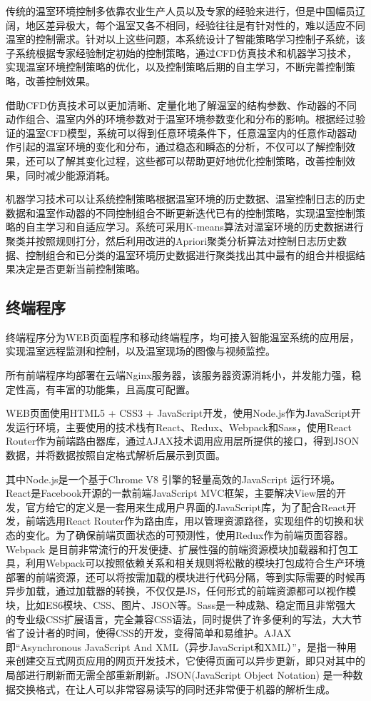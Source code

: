 传统的温室环境控制多依靠农业生产人员以及专家的经验来进行，但是中国幅员辽阔，地区差异极大，每个温室又各不相同，经验往往是有针对性的，难以适应不同温室的控制需求。针对以上这些问题，本系统设计了智能策略学习控制子系统，该子系统根据专家经验制定初始的控制策略，通过CFD仿真技术和机器学习技术，实现温室环境控制策略的优化，以及控制策略后期的自主学习，不断完善控制策略，改善控制效果。

借助CFD仿真技术可以更加清晰、定量化地了解温室的结构参数、作动器的不同动作组合、温室内外的环境参数对于温室环境参数变化和分布的影响。根据经过验证的温室CFD模型，系统可以得到任意环境条件下，任意温室内的任意作动器动作引起的温室环境的变化和分布，通过稳态和瞬态的分析，不仅可以了解控制效果，还可以了解其变化过程，这些都可以帮助更好地优化控制策略，改善控制效果，同时减少能源消耗。

机器学习技术可以让系统控制策略根据温室环境的历史数据、温室控制日志的历史数据和温室作动器的不同控制组合不断更新迭代已有的控制策略，实现温室控制策略的自主学习和自适应学习。系统可采用K-means算法对温室环境的历史数据进行聚类并按照规则打分，然后利用改进的Apriori聚类分析算法对控制日志历史数据、控制组合和已分类的温室环境历史数据进行聚类找出其中最有的组合并根据结果决定是否更新当前控制策略。

	\subsection{终端程序}
终端程序分为WEB页面程序和移动终端程序，均可接入智能温室系统的应用层，实现温室远程监测和控制，以及温室现场的图像与视频监控。

所有前端程序均部署在云端Nginx服务器，该服务器资源消耗小，并发能力强，稳定性高，有丰富的功能集，且高度可配置。

WEB页面使用HTML5 + CSS3 + JavaScript开发，使用Node.js作为JavaScript开发运行环境，主要使用的技术栈有React、Redux、Webpack和Sass，使用React Router作为前端路由器库，通过AJAX技术调用应用层所提供的接口，得到JSON数据，并将数据按照自定格式解析后展示到页面。

其中Node.js是一个基于Chrome V8 引擎的轻量高效的JavaScript 运行环境。React是Facebook开源的一款前端JavaScript MVC框架，主要解决View层的开发，官方给它的定义是一套用来生成用户界面的JavaScript库，为了配合React开发，前端选用React Router作为路由库，用以管理资源路径，实现组件的切换和状态的变化。为了确保前端页面状态的可预测性，使用Redux作为前端页面容器。Webpack 是目前非常流行的开发便捷、扩展性强的前端资源模块加载器和打包工具，利用Webpack可以按照依赖关系和相关规则将松散的模块打包成符合生产环境部署的前端资源，还可以将按需加载的模块进行代码分隔，等到实际需要的时候再异步加载，通过加载器的转换，不仅仅是JS，任何形式的前端资源都可以视作模块，比如ES6模块、CSS、图片、JSON等。Sass是一种成熟、稳定而且非常强大的专业级CSS扩展语言，完全兼容CSS语法，同时提供了许多便利的写法，大大节省了设计者的时间，使得CSS的开发，变得简单和易维护。AJAX即“Asynchronous JavaScript And XML（异步JavaScript和XML）”，是指一种用来创建交互式网页应用的网页开发技术，它使得页面可以异步更新，即只对其中的局部进行刷新而无需全部重新刷新。JSON(JavaScript Object Notation) 是一种数据交换格式，在让人可以非常容易读写的同时还非常便于机器的解析生成。

